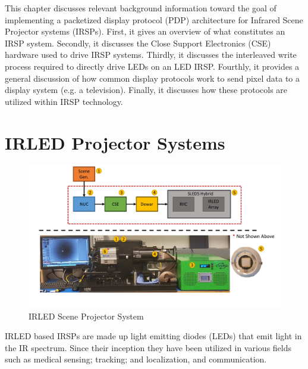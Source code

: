\label{chap:background}

This chapter discusses relevant background information toward the goal of implementing a packetized display protocol (PDP) architecture for Infrared Scene Projector systems (IRSPs). First, it gives an overview of what constitutes an IRSP system. Secondly, it discusses the Close Support Electronics (CSE) hardware used to drive IRSP systems. Thirdly, it discusses the interleaved write process required to directly drive LEDs on an LED IRSP. Fourthly, it provides a general discussion of how common display protocols work to send pixel data to a display system (e.g. a television). Finally, it discusses how these protocols are utilized within IRSP technology.

\section{IRLED Projector Systems}
\label{sec:irled_projector_systems}
    \begin{figure}
        \centering
        \includegraphics[trim=0.45in 1.25in 0.0in 0in,width=1.0\textwidth]{fig/sleds_system.pdf}
        \caption{IRLED Scene Projector System}
        \label{fig:sleds_system}
    \end{figure}

    IRLED based IRSPs are made up light emitting diodes (LEDs) that emit light in the IR spectrum\cite{biard1966semiconductor}. Since their inception they have been utilized in various fields such as medical sensing\cite{MonteiroEtAl2011,MEEKS1998433,Sadick2009,takhtfooladi2015effects,yamanishi1995respiration}; tracking; and localization\cite{PlotogVladescu2015,Kimon2001,SCHOLZ20151233,WalshDaemsSteckel2015,zeylikovich2003mid}, and communication\cite{CossuEtAl2014,escobosa2004ir,GeorgopoulosKormakopoulos1986,sohn2007localization,JangEtAl2012}.

